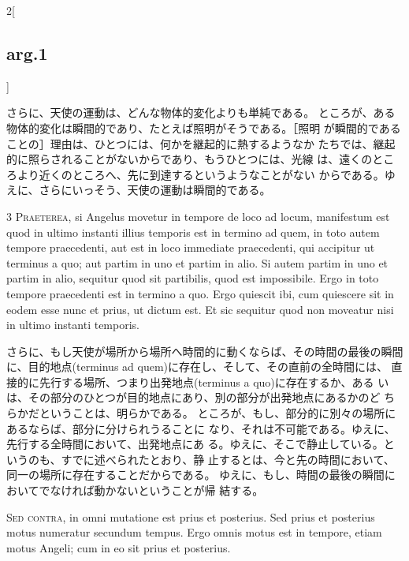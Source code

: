 \documentclass[paper=a4paper,fontsize=10pt,jafontsize=9pt,titlepage]{jlreq}
\begin{document}
\begin{paracol}{2}[\subsection{arg.1}]
\switchcolumn

さらに、天使の運動は、どんな物体的変化よりも単純である。
ところが、ある物体的変化は瞬間的であり、たとえば照明がそうである。［照明
 が瞬間的であることの］理由は、ひとつには、何かを継起的に熱するようなか
 たちでは、継起的に照らされることがないからであり、もうひとつには、光線
 は、遠くのところより近くのところへ、先に到達するというようなことがない
 からである。ゆえに、さらにいっそう、天使の運動は瞬間的である。


{\scshape 3 Praeterea}, si Angelus movetur in tempore de
loco ad locum, manifestum est quod in ultimo instanti illius temporis
est in termino ad quem, in toto autem tempore praecedenti, aut est in
loco immediate praecedenti, qui accipitur ut terminus a quo; aut partim
in uno et partim in alio. Si autem partim in uno et partim in alio,
sequitur quod sit partibilis, quod est impossibile. Ergo in toto tempore
praecedenti est in termino a quo. Ergo quiescit ibi, cum quiescere sit
in eodem esse nunc et prius, ut dictum est. Et sic sequitur quod non
moveatur nisi in ultimo instanti temporis.

\switchcolumn

さらに、もし天使が場所から場所へ時間的に動くならば、その時間の最後の瞬間
 に、目的地点(terminus ad quem)に存在し、そして、その直前の全時間には、
 直接的に先行する場所、つまり出発地点(terminus a quo)に存在するか、ある
 いは、その部分のひとつが目的地点にあり、別の部分が出発地点にあるかのど
 ちらかだということは、明らかである。
ところが、もし、部分的に別々の場所にあるならば、部分に分けられうることに
 なり、それは不可能である。ゆえに、先行する全時間において、出発地点にあ
 る。ゆえに、そこで静止している。というのも、すでに述べられたとおり、静
 止するとは、今と先の時間において、同一の場所に存在することだからである。
 ゆえに、もし、時間の最後の瞬間においてでなければ動かないということが帰
 結する。

\switchcolumn*[\subsection{s.c.}]

{\scshape  Sed contra}, in omni mutatione est prius et
posterius. Sed prius et posterius motus numeratur secundum tempus. Ergo
omnis motus est in tempore, etiam motus Angeli; cum in eo sit prius et
posterius.


\end{paracol}
\end{document}
